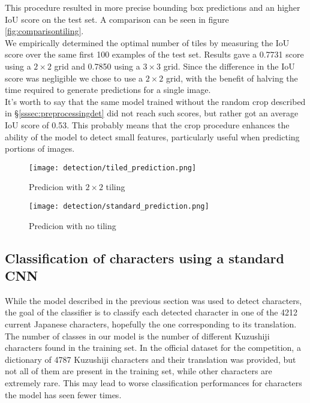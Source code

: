 This procedure resulted in more precise bounding box predictions and an higher IoU score on the test set. A comparison can be seen in figure \ref{fig:comparisontiling}. \\
We empirically determined the optimal number of tiles by measuring the IoU score over the same first 100 examples of the test set. Results gave a 0.7731 score using a $2 \times 2$ grid and 0.7850 using a $3 \times 3$ grid. 
Since the difference in the IoU score was negligible we chose to use a $2 \times 2$ grid, with the benefit of halving the time required to generate predictions for a single image.\\
It's worth to say that the same model trained without the random crop described in §\ref{sssec:preprocessingdet} did not reach such scores, but rather got an average IoU score of 0.53. This probably means that the crop procedure enhances the ability of the model to detect small features, particularly useful when predicting portions of images.

\begin{figure*}[h!]
	\centering
	\begin{subfigure}{\columnwidth}
		\centering
		\texttt{[image: detection/tiled\_prediction.png]}
		\caption{Predicion with $2\times2$ tiling}
		\label{fig:tiledpred}
	\end{subfigure}
	\begin{subfigure}{\columnwidth}
		\centering
		\texttt{[image: detection/standard\_prediction.png]}
		\caption{Predicion with no tiling}
		\label{fig:standardpred}
	\end{subfigure}
	\caption{Comparison of predicion on the same page with or without tiling. Image (\ref{fig:tiledpred}) has a IoU score of 0.83, while (\ref{fig:standardpred}) scored 0.59.}
	\label{fig:comparisontiling}
\end{figure*}

\subsection{Classification of characters using a standard CNN}
\label{ssec:classificationcnn}

While the model described in the previous section was used to detect characters, the goal of the classifier is to classify each detected character in one of the 4212 current Japanese characters, hopefully the one corresponding to its translation. The number of classes in our model is the number of different Kuzushiji characters found in the training set. In the official dataset for the competition, a dictionary of 4787 Kuzushiji characters and their translation was provided, but not all of them are present in the training set, while other characters are extremely rare. This may lead to worse classification performances for characters the model has seen fewer times.

